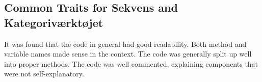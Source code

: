 \subsection{Common Traits for Sekvens and Kategoriværktøjet}\label{subsec:collab_commontraits}
It was found that the code in general had good readability. Both method and variable names made sense in the context. The code was generally split up well into proper methods. The code was well commented, explaining components that were not self-explanatory.  